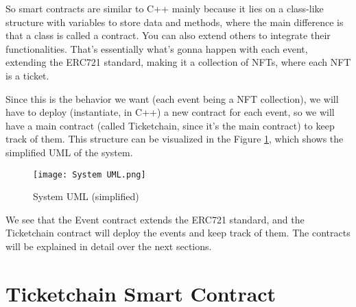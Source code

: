 So smart contracts are similar to C++ mainly because it lies on a class-like
structure with variables to store data and methods, where the main difference
is that a class is called a contract. You can also extend others to integrate
their functionalities. That's essentially what's gonna happen with each event,
extending the ERC721 standard, making it a collection of NFTs, where each NFT
is a ticket.

Since this is the behavior we want (each event being a NFT collection), we will
have to deploy (instantiate, in C++) a new contract for each event, so we will
have a main contract (called Ticketchain, since it's the main contract) to keep
track of them. This structure can be visualized in the Figure
\ref{fig:system_uml}, which shows the simplified UML of the system.

\begin{figure}[H]
	\texttt{[image: System UML.png]}
	\centering
	\caption{System UML (simplified)}
	\label{fig:system_uml}
\end{figure}

We see that the Event contract extends the ERC721 standard, and the Ticketchain
contract will deploy the events and keep track of them. The contracts will be
explained in detail over the next sections.




\section{Ticketchain Smart Contract}
\label{subsec:ticketchain_smart_contract}

